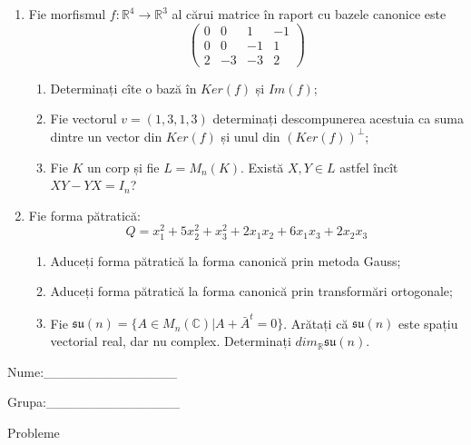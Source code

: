 \documentclass{article}
\begin{document}
\begin{enumerate}
 \item Fie morfismul $f:\mathbb{R}^4 \to \mathbb{R}^3$ al cărui matrice în raport cu bazele canonice este
$$\begin{pmatrix}
0&0&1&-1\\
0&0&-1&1\\
2&-3&-3&2
\end{pmatrix}$$

\begin{enumerate}
\item Determinați cîte o bază în $Ker(f)$ și $Im(f)$;
\item Fie vectorul $v=(1,3,1,3)$ determinați descompunerea acestuia ca suma dintre un vector din $Ker(f)$ și unul din $(Ker(f))^\perp$;
\item Fie $K$ un corp și fie $L=M_n(K)$. Există $X,Y \in L$ astfel încît $XY-YX=I_n$?  
\end{enumerate}
\item Fie forma pătratică:
$$Q= x_1^2+5x_2^2+x_3^2+2x_1x_2+6x_1x_3+2x_2x_3$$

\begin{enumerate}
\item Aduceți forma pătratică la forma canonică prin metoda Gauss;
\item Aduceți forma pătratică la forma canonică prin transformări ortogonale;
\item Fie $\mathfrak{su}(n)=\{ A \in M_n(\mathbb{C}) | A+\bar{A}^t=0\}$. Arătați că $\mathfrak{su}(n)$ este spațiu vectorial real, dar nu complex.
Determinați $dim_{\mathbb{R}}\mathfrak{su}(n)$.
\end{enumerate}
\end{enumerate}
\newpage
\begin{flushright}
Nume:\_\_\_\_\_\_\_\_\_\_\_\_\_\_
 
 
Grupa:\_\_\_\_\_\_\_\_\_\_\_\_\_\_
\end{flushright}
\begin{center}
\vspace{2cm}
{\Large Probleme}
\vspace{2cm}
\end{center}
\end{document}
